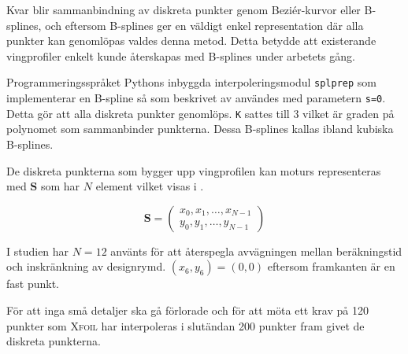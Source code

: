 Kvar blir sammanbindning av diskreta punkter genom Beziér-kurvor eller B-splines, och eftersom B-splines ger en väldigt enkel representation där alla punkter kan genomlöpas valdes denna metod. Detta betydde att existerande vingprofiler enkelt kunde återskapas med B-splines under arbetets gång.

Programmeringsspråket Pythons inbyggda interpoleringsmodul \lstinline[breaklines=true]!splprep! som implementerar en B-spline så som beskrivet av \citet{B-spline} användes med parametern \lstinline[breaklines=true]!s=0!. Detta gör att alla diskreta punkter genomlöps. \lstinline[breaklines=true]!K! sattes till 3 vilket är graden på polynomet som sammanbinder punkterna. Dessa B-splines kallas ibland kubiska B-splines.



  

De diskreta punkterna som bygger upp vingprofilen kan moturs representeras med  $\mathbf{S}$ som har $N$ element vilket visas i . 

$$
\mathbf{S} = 
\begin{pmatrix}
x_0, x_1, \dots, x_{N-1} \\
y_0, y_1, \dots, y_{N-1} 
\end{pmatrix}
$$

I studien har $N = 12$ använts för att återspegla avvägningen mellan beräkningstid och inskränkning av designrymd. $\left ( x_6, y_6 \right ) = \left ( 0,0 \right )$ eftersom framkanten är en fast punkt. 

För att inga små detaljer ska gå förlorade och för att möta ett krav på 120 punkter som \textsc{Xfoil} har \citep{Xfoil} interpoleras i slutändan 200 punkter fram givet de diskreta punkterna.

